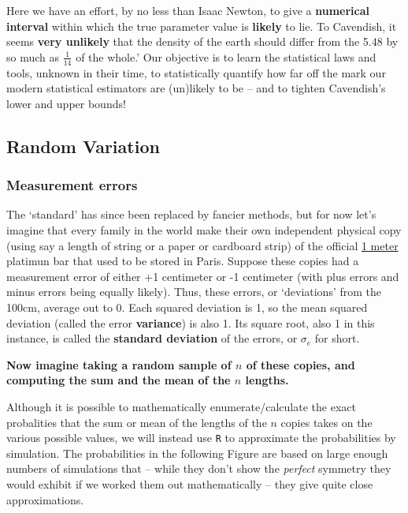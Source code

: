 \documentclass[
]{article}
\begin{document}
Here we have an effort, by no less than Isaac Newton, to give a
\textbf{numerical interval} within which the true parameter value is
\textbf{likely} to lie. To Cavendish, it seems \textbf{very unlikely}
that the density of the earth should differ from the 5.48 by so much as
\(\frac{1}{14}\) of the whole.' Our objective is to learn the
statistical laws and tools, unknown in their time, to statistically
quantify how far off the mark our modern statistical estimators are
(un)likely to be -- and to tighten Cavendish's lower and upper bounds!

\hypertarget{random-variation}{%
\subsection{Random Variation}\label{random-variation}}

\hypertarget{measurement-errors}{%
\subsubsection{Measurement errors}\label{measurement-errors}}

The `standard' has since been replaced by fancier methods, but for now
let's imagine that every family in the world make their own independent
physical copy (using say a length of string or a paper or cardboard
strip) of the official
\href{https://en.wikipedia.org/wiki/History_of_the_metre}{1 meter}
platimun bar that used to be stored in Paris. Suppose these copies had a
measurement error of either +1 centimeter or -1 centimeter (with plus
errors and minus errors being equally likely). Thus, these errors, or
`deviations' from the 100cm, average out to 0. Each squared deviation is
1, so the mean squared deviation (called the error \textbf{variance}) is
also 1. Its square root, also 1 in this instance, is called the
\textbf{standard deviation} of the errors, or \(\sigma_{e}\) for short.

\textbf{Now imagine taking a random sample of \(n\) of these copies, and
computing the sum and the mean of the \(n\) lengths.}

Although it is possible to mathematically enumerate/calculate the exact
probalities that the sum or mean of the lengths of the \(n\) copies
takes on the various possible values, we will instead use \texttt{R} to
approximate the probabilities by simulation. The probabilities in the
following Figure are based on large enough numbers of simulations that
-- while they don't show the \emph{perfect} symmetry they would exhibit
if we worked them out mathematically -- they give quite close
approximations.
\end{document}
